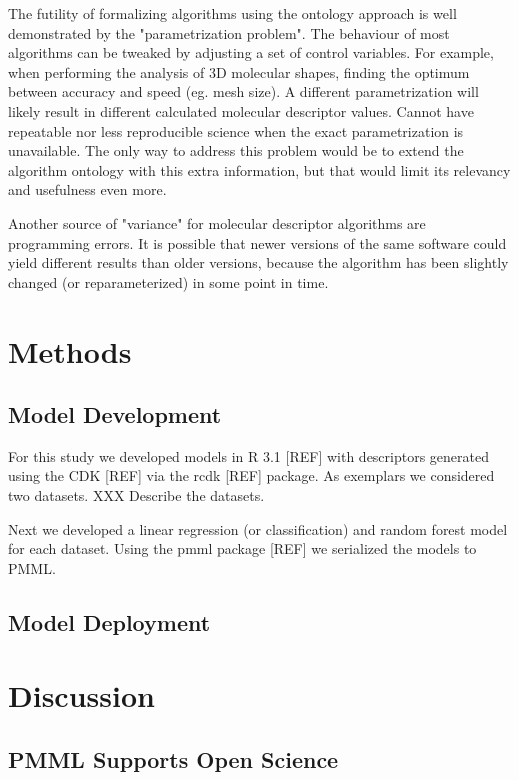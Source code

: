 \documentclass[12pt,letterpaper]{article}
\begin{document}
The futility of formalizing algorithms using the ontology approach is
well demonstrated by the "parametrization problem". The behaviour of most
algorithms can be tweaked by adjusting a set of control variables. For 
example, when performing the analysis of 3D molecular shapes, finding the 
optimum between accuracy and speed (eg. mesh size). A different
parametrization will likely result in different calculated molecular
descriptor values. Cannot have repeatable nor less reproducible science
when the exact parametrization is unavailable. The only way to address
this problem would be to extend the algorithm ontology with this extra
information, but that would limit its relevancy and usefulness even more.

Another source of "variance" for molecular descriptor algorithms are 
programming errors. It is possible that newer versions of the same software 
could yield different results than older versions, because the algorithm
has been slightly changed (or reparameterized) in some point in time.

\section{Methods}
\label{sec:methods}

\subsection{Model Development}
\label{sec:model-development}

For this study we developed models in R 3.1 [REF] with descriptors
generated using the CDK [REF] via the rcdk [REF] package. As exemplars
we considered two datasets. XXX Describe the datasets.

Next we developed a linear regression (or classification) and random
forest  model  for each dataset. Using the pmml package [REF] we
serialized the models to PMML.

\subsection{Model Deployment}
\label{sec:model-deployment}


\section{Discussion}
\label{sec:discussion}

\subsection{PMML Supports Open Science}
\label{sec:pmml-supports-open}
\end{document}
